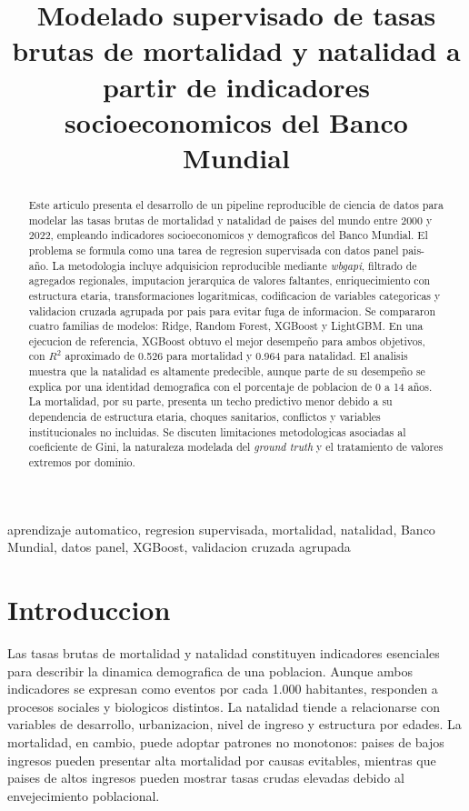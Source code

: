 \documentclass[conference]{IEEEtran}
\title{Modelado supervisado de tasas brutas de mortalidad y natalidad a partir de indicadores socioeconomicos del Banco Mundial}
\author{
  \IEEEauthorblockN{Guillermo Paredes, Donato Oña, Mateo Villacreses, Karla Estefania Moras Cajas}
  \IEEEauthorblockA{
    Universidad Internacional del Ecuador (UIDE)\\
    Ecuador\\
  }
}
\begin{document}
\maketitle

\begin{abstract}
Este articulo presenta el desarrollo de un pipeline reproducible de ciencia de datos para modelar las tasas brutas de mortalidad y natalidad de paises del mundo entre 2000 y 2022, empleando indicadores socioeconomicos y demograficos del Banco Mundial. El problema se formula como una tarea de regresion supervisada con datos panel pais-año. La metodologia incluye adquisicion reproducible mediante \textit{wbgapi}, filtrado de agregados regionales, imputacion jerarquica de valores faltantes, enriquecimiento con estructura etaria, transformaciones logaritmicas, codificacion de variables categoricas y validacion cruzada agrupada por pais para evitar fuga de informacion. Se compararon cuatro familias de modelos: Ridge, Random Forest, XGBoost y LightGBM. En una ejecucion de referencia, XGBoost obtuvo el mejor desempeño para ambos objetivos, con $R^2$ aproximado de 0.526 para mortalidad y 0.964 para natalidad. El analisis muestra que la natalidad es altamente predecible, aunque parte de su desempeño se explica por una identidad demografica con el porcentaje de poblacion de 0 a 14 años. La mortalidad, por su parte, presenta un techo predictivo menor debido a su dependencia de estructura etaria, choques sanitarios, conflictos y variables institucionales no incluidas. Se discuten limitaciones metodologicas asociadas al coeficiente de Gini, la naturaleza modelada del \textit{ground truth} y el tratamiento de valores extremos por dominio.
\end{abstract}

\begin{IEEEkeywords}
aprendizaje automatico, regresion supervisada, mortalidad, natalidad, Banco Mundial, datos panel, XGBoost, validacion cruzada agrupada
\end{IEEEkeywords}

\section{Introduccion}

Las tasas brutas de mortalidad y natalidad constituyen indicadores esenciales para describir la dinamica demografica de una poblacion. Aunque ambos indicadores se expresan como eventos por cada 1.000 habitantes, responden a procesos sociales y biologicos distintos. La natalidad tiende a relacionarse con variables de desarrollo, urbanizacion, nivel de ingreso y estructura por edades. La mortalidad, en cambio, puede adoptar patrones no monotonos: paises de bajos ingresos pueden presentar alta mortalidad por causas evitables, mientras que paises de altos ingresos pueden mostrar tasas crudas elevadas debido al envejecimiento poblacional.
\end{document}
